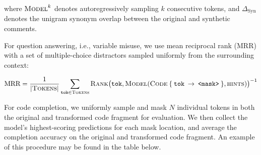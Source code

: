 \documentclass[usenames,dvipsnames]{article} %
\begin{document}
  where $\textsc{Model}^{k}$ denotes autoregressively sampling $k$ consecutive tokens, and $\Delta_\text{Syn}$ denotes the unigram synonym overlap between the original and synthetic comments.

  For question answering, i.e., variable misuse, we use mean reciprocal rank (MRR) with a set of multiple-choice distractors sampled uniformly from the surrounding context:

  \begin{equation*}
    \text{MRR} = \frac{1}{|\textsc{Tokens}|} \sum_{\texttt{tok}\in\textsc{Tokens}} \textsc{Rank}\big(\texttt{tok}, \textsc{Model}(\textsc{Code}\:\{\:\texttt{tok}\:\rightarrow\:\texttt{<mask>}\:\}, \textsc{hints})\big)^{-1}
  \end{equation*}

  For code completion, we uniformly sample and mask $N$ individual tokens in both the original and transformed code fragment for evaluation. We then collect the model's highest-scoring predictions for each mask location, and average the completion accuracy on the original and transformed code fragment. An example of this procedure may be found in the table below.
\end{document}
